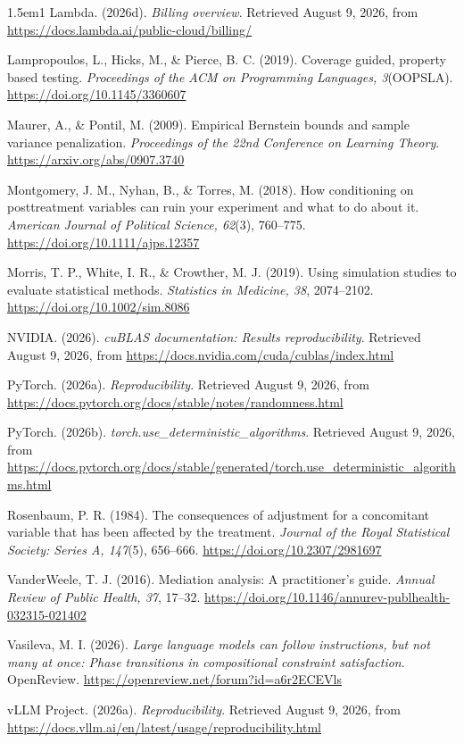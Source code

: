 \documentclass[11pt,a4paper]{article}
\begin{document}
\begin{hangparas}{1.5em}{1}
Lambda. (2026d). \textit{Billing overview}. Retrieved August 9, 2026, from \url{https://docs.lambda.ai/public-cloud/billing/}

Lampropoulos, L., Hicks, M., \& Pierce, B. C. (2019). Coverage guided, property based testing. \textit{Proceedings of the ACM on Programming Languages, 3}(OOPSLA). \url{https://doi.org/10.1145/3360607}

Maurer, A., \& Pontil, M. (2009). Empirical Bernstein bounds and sample variance penalization. \textit{Proceedings of the 22nd Conference on Learning Theory}. \url{https://arxiv.org/abs/0907.3740}

Montgomery, J. M., Nyhan, B., \& Torres, M. (2018). How conditioning on posttreatment variables can ruin your experiment and what to do about it. \textit{American Journal of Political Science, 62}(3), 760--775. \url{https://doi.org/10.1111/ajps.12357}

Morris, T. P., White, I. R., \& Crowther, M. J. (2019). Using simulation studies to evaluate statistical methods. \textit{Statistics in Medicine, 38}, 2074--2102. \url{https://doi.org/10.1002/sim.8086}

NVIDIA. (2026). \textit{cuBLAS documentation: Results reproducibility}. Retrieved August 9, 2026, from \url{https://docs.nvidia.com/cuda/cublas/index.html}

PyTorch. (2026a). \textit{Reproducibility}. Retrieved August 9, 2026, from \url{https://docs.pytorch.org/docs/stable/notes/randomness.html}

PyTorch. (2026b). \textit{torch.use\_deterministic\_algorithms}. Retrieved August 9, 2026, from \url{https://docs.pytorch.org/docs/stable/generated/torch.use_deterministic_algorithms.html}

Rosenbaum, P. R. (1984). The consequences of adjustment for a concomitant variable that has been affected by the treatment. \textit{Journal of the Royal Statistical Society: Series A, 147}(5), 656--666. \url{https://doi.org/10.2307/2981697}

VanderWeele, T. J. (2016). Mediation analysis: A practitioner's guide. \textit{Annual Review of Public Health, 37}, 17--32. \url{https://doi.org/10.1146/annurev-publhealth-032315-021402}

Vasileva, M. I. (2026). \textit{Large language models can follow instructions, but not many at once: Phase transitions in compositional constraint satisfaction}. OpenReview. \url{https://openreview.net/forum?id=a6r2ECEVls}

vLLM Project. (2026a). \textit{Reproducibility}. Retrieved August 9, 2026, from \url{https://docs.vllm.ai/en/latest/usage/reproducibility.html}


\end{hangparas}
\end{document}

